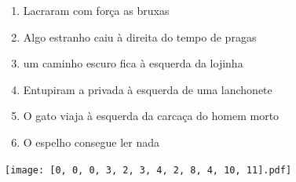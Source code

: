 \documentclass[12pt]{article}
\begin{document}
		 

\pagebreak


	\begin{enumerate}
		  \sffamily %
		  \large %


\vfill \item
Lacraram com força	%
as bruxas	%

\vfill \item
Algo estranho caiu	%
à direita
do tempo de pragas	%

\vfill \item
um caminho escuro fica	%
à esquerda
da lojinha	%

\vfill \item
Entupiram a privada	%
à esquerda
de uma lanchonete	%

\vfill \item
O gato viaja	%
à esquerda
da carcaça do homem morto	%

\vfill \item
O espelho	%
consegue ler nada	%
	\end{enumerate}
		  
		  \hfill

		  \vfill

\texttt{[image: [0, 0, 0, 3, 2, 3, 4, 2, 8, 4, 10, 11].pdf]}


	\hfill	  	  

\end{document}
